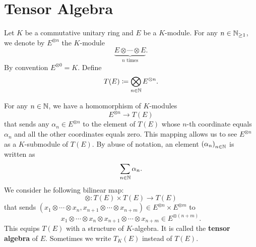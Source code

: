 \section{Tensor Algebra}

\begin{definitionenv}
    Let $K$ be a commutative unitary ring and $E$ be a $K$-module.
    For any $n \in \mathbb{N}_{\ge 1}$, we denote by $E^{\otimes n}$ the $K$-module
     $$\underset{n \text{ times}}{\underbrace{E\otimes \cdots\otimes E}}.$$
    By convention $E^{\otimes 0} = K.$
    Define
    $$ T(E) \coloneq \bigotimes_{n\in \mathbb{N}} E^{\otimes n}.$$

    For any $n\in \mathbb{N}$, we have a homomorphism of $K$-modules
    $$ E^{\otimes n} \rightarrow T(E)$$
    that sends any $\alpha_n \in E^{\otimes n}$ to the element of $T(E)$ whose $n$-th coordinate equals $\alpha_n$ and all the other coordinates equals zero.
    This mapping allows us to see $E^{\otimes n}$ as a $K$-submodule of $T(E)$.
    By abuse of notation, an element $\left(\alpha_n\right)_{n\in \mathbb{N}}$ is written as
    $$ \sum_{n\in \mathbb{N}} \alpha_n.$$
    We consider he following bilinear map:
    $$ \otimes : T(E) \times T(E) \rightarrow T(E)$$
    that sends $(x_1\otimes \cdots \otimes x_n, x_{n+1}\otimes \cdots \otimes x_{n+m}) \in E^{\otimes n} \times E^{\otimes m}$ to
    $$ x_1 \otimes \cdots \otimes x_n \otimes x_{n+1} \otimes \cdots \otimes x_{n+m} \in E^{\otimes (n+m)}.$$
    This equips $T(E)$ with a structure of $K$-algebra.
    It is called the \textbf{tensor algebra} of $E$.
    Sometimes we write $T_{K}(E)$ instead of $T(E)$.
\end{definitionenv}

